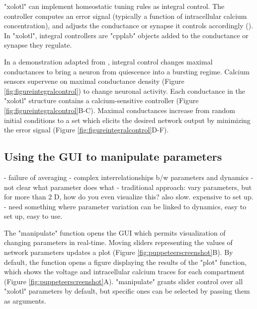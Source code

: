 \documentclass{frontiersSCNS} %
\begin{document}
"xolotl" can implement homeostatic tuning rules as integral control. The controller computes an error signal (typically a function of intracellular calcium concentration), and adjusts the conductance or synapse it controls accordingly (\cite{olearyCorrelationsIonChannel2013}). In "xolotl", integral controllers are "cpplab" objects added to the conductance or synapse they regulate.

In a demonstration adapted from \cite{olearyCorrelationsIonChannel2013}, integral control changes maximal conductances to bring a neuron from quiescence into a bursting regime. Calcium sensors supervene on maximal conductance density (Figure \ref{fig:figureintegralcontrol}) to change neuronal activity. Each conductance in the "xolotl" structure contains a calcium-sensitive controller (Figure \ref{fig:figureintegralcontrol}B-C). Maximal conductances increase from random initial conditions to a set which elicits the desired network output by minimizing the error signal (Figure \ref{fig:figureintegralcontrol}D-F).

%
%
%
%
%
%

\subsection{Using the GUI to manipulate parameters}


- failure of averaging
- complex interrelationships b/w parameters and dynamics
- not clear what parameter does what
- traditional approach: vary parameters, but for more than 2 D, how do you even visualize this? also slow. expensive to set up. 
- need something where parameter variation can be linked to dynamics, easy to set up, easy to use. 

The "manipulate" function opens the GUI which permits visualization of changing parameters in real-time. Moving sliders representing the values of network parameters updates a plot (Figure \ref{fig:puppeteerscreenshot}B). By default, the function opens a figure displaying the results of the "plot" function, which shows the voltage and intracellular calcium traces for each compartment (Figure \ref{fig:puppeteerscreenshot}A). "manipulate" grants slider control over all "xolotl" parameters by default, but specific ones can be selected by passing them as arguments.
\end{document}
